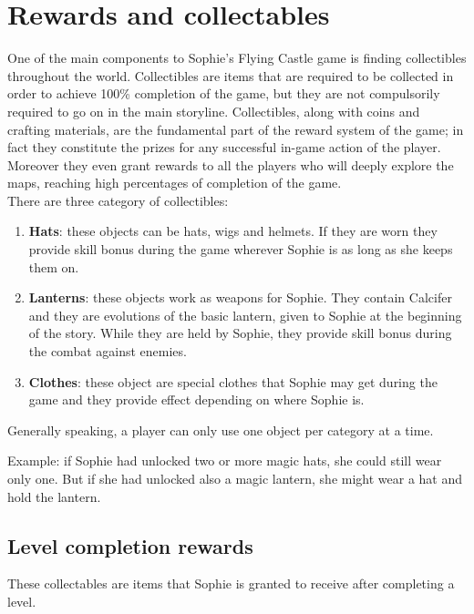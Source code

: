 \section{Rewards and collectables}
One of the main components to Sophie's Flying Castle game is finding collectibles throughout the world.
Collectibles are items that are required to be collected in order to achieve 100\%
completion of the game, but they are not compulsorily required to go on in the main storyline. Collectibles, along with coins and crafting materials, are the fundamental part of the reward system of the game; in fact they constitute the prizes for any successful in-game action of the player. Moreover they even grant rewards to all the players who will deeply explore the maps, reaching high percentages of completion of the game.\\

There are three category of collectibles:
\begin{enumerate}
\item \textbf{Hats}: these objects can be hats, wigs and helmets. If they are worn they provide skill bonus during the game wherever Sophie is as long as she keeps them on.
\item \textbf{Lanterns}: these objects work as weapons for Sophie. They contain Calcifer and they are evolutions of the basic lantern, given to Sophie at the beginning of the story. While they are held by Sophie, they provide skill bonus during the combat against enemies. 
\item \textbf{Clothes}: these object are special clothes that Sophie may get during the game and they provide effect depending on where Sophie is.  
  \end{enumerate}

Generally speaking, a player can only use one object per category at a time.

Example: if Sophie had unlocked two or more magic hats, she could still wear only one. But if she had unlocked also a magic lantern, she might wear a hat and hold the lantern.

\subsection{Level completion rewards}
These collectables are items that Sophie is granted to receive after completing a level.


